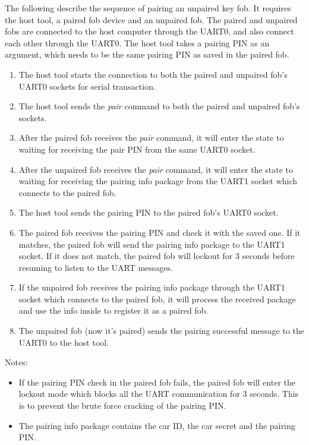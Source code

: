 \documentclass[11pt,oneside,onecolumn,letterpaper]{article}
\begin{document}
The following describe the sequence of pairing an unpaired key fob. It requires the host tool, a paired fob device and an unpaired fob. The paired and unpaired fobs are connected to the host computer through the UART0, and also connect each other through the UART0. The host tool takes a pairing PIN as an argument, which needs to be the same pairing PIN as saved in the paired fob.
\begin{enumerate}
	\item The host tool starts the connection to both the paired and unpaired fob's UART0 sockets for serial transaction.
	\item The host tool sends the \textit{pair} command to both the paired and unpaired fob's sockets.
	\item After the paired fob receives the \textit{pair} command, it will enter the state to waiting for receiving the pair PIN from the same UART0 socket.
	\item After the unpaired fob receives the \textit{pair} command, it will enter the state to waiting for receiving the pairing info package from the UART1 socket which connects to the paired fob.
	\item The host tool sends the pairing PIN to the paired fob's UART0 socket.
	\item The paired fob receives the pairing PIN and check it with the saved one. If it matches, the paired fob will send the pairing info package to the UART1 socket. If it does not match, the paired fob will lockout for 3 seconds before resuming to listen to the UART messages.
	\item If the unpaired fob receives the pairing info package through the UART1 socket which connects to the paired fob, it will process the received package and use the info inside to register it as a paired fob. 
	\item The unpaired fob (now it's paired) sends the pairing successful message to the UART0 to the host tool.
\end{enumerate}

Notes:
\begin{itemize}
	\item If the pairing PIN check in the paired fob fails, the paired fob will enter the lockout mode which blocks all the UART communication for 3 seconds. This is to prevent the brute force cracking of the pairing PIN.
	\item The pairing info package contains the car ID, the car secret and the pairing PIN.
\end{itemize}
\end{document}
